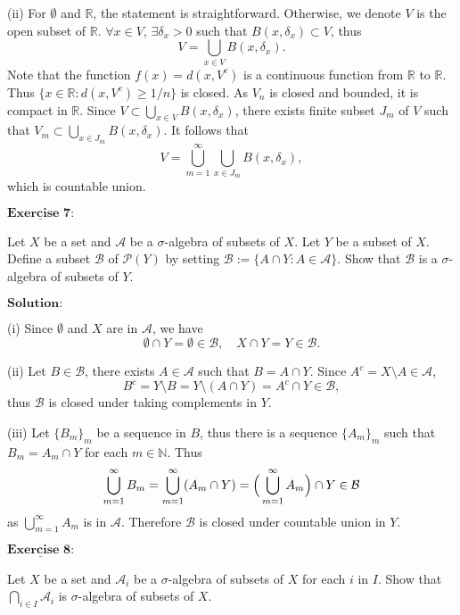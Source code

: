 \documentclass[12pt,a4paper]{ctexart}
\begin{document}
(ii) For $\emptyset$ and $\mathbb R$, the statement is straightforward. Otherwise, we denote $V$ is the open subset of $\mathbb R$. $\forall x \in V$, $\exists \delta_x > 0$ such that $B(x, \delta_x) \subset V$, thus
$$ V = \bigcup_{x \in V} B(x, \delta_x).$$
Note that the function $f(x) = d(x, V^c)$ is a continuous function from $\mathbb R$ to $\mathbb R$. Thus $\{x \in \mathbb R: d(x, V^c) \geq 1/n \}$ is closed. As $V_n$ is closed and bounded, it is compact in $\mathbb R$. Since $V \subset \bigcup_{x \in V} B(x, \delta_x)$, there exists finite subset $J_m$ of $V$ such that $V_m \subset \bigcup_{x \in J_m} B(x, \delta_x)$. It follows that
$$V = \bigcup_{m = 1}^{\infty} \bigcup_{x \in J_m} B(x, \delta_x),$$
which is countable union.



\newpage


$\underline{\textbf{Exercise 7:}}$

Let $X$ be a set and $\mathcal A$ be a $\sigma$-algebra of subsets of $X$. Let $Y$ be a subset of $X$. Define a subset $\mathcal B$ of $\mathcal P(Y)$ by setting $\mathcal B := \{A \cap Y: A \in \mathcal A\}$. Show that $\mathcal B$ is a $\sigma$-algebra of subsets of $Y$.
  
\vspace{8pt}
$\textbf{Solution:}$

(i) Since $\emptyset$ and $X$ are in $\mathcal A$, we have
$$\emptyset \cap Y = \emptyset \in \mathcal B, \quad X \cap Y = Y \in \mathcal B.$$

(ii) Let $B \in \mathcal B$, there exists $A \in \mathcal A$ such that $B = A \cap Y$. Since $A ^c = X \setminus A \in \mathcal A$, 
$$B^c = Y \setminus B = Y \setminus (A \cap Y) = A^c \cap Y \in \mathcal B,$$
thus $\mathcal B$ is closed under taking complements in $Y$.

(iii) Let $\{B_m\}_{m}$ be a sequence in $B$, thus there is a sequence $\{A_m\}_{m}$ such that $B_m = A_m \cap Y$ for each $m \in \mathbb N$. Thus
$$\bigcup_{m=1}^{\infty} B_m = \bigcup_{m=1}^{\infty} (A_m \cap Y) = \Big{(} \bigcup_{m=1}^{\infty} A_m \Big{)} \cap Y  \in \mathcal B$$
as $\bigcup_{m=1}^{\infty} A_m$ is in $\mathcal A$. Therefore $\mathcal B$ is closed under countable union in $Y$.


\vspace{8pt}

$\underline{\textbf{Exercise 8:}}$

Let $X$ be a set and $\mathcal A_i$ be a $\sigma$-algebra of subsets of $X$ for each $i$ in $I$. Show that $\bigcap_{i \in I} \mathcal A_i$ is $\sigma$-algebra of subsets of $X$.
\end{document}
